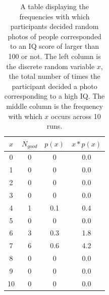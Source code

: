 \documentclass{article}
\begin{document}
\begin{enumerate}
\begin{table}
\centering
\begin{tabular}{| c | c | c | c |}
\hline
\textbf{$x$} & $N_{good}$ & $p(x)$ & $x*p(x)$ \\ \hline \hline
0 & 0 & 0 & 0.0 \\ \hline
1 & 0 & 0 & 0.0 \\ \hline
2 & 0 & 0 & 0.0 \\ \hline
3 & 0 & 0 & 0.0 \\ \hline
4 & 1 & 0.1 & 0.4 \\ \hline
5 & 0 & 0 & 0.0 \\ \hline
6 & 3 & 0.3 & 1.8 \\ \hline
7 & 6 & 0.6 & 4.2 \\ \hline
8 & 0 & 0 & 0.0 \\ \hline
9 & 0 & 0 & 0.0 \\ \hline
10 & 0 & 0 & 0.0 \\ \hline
\hline
\end{tabular}
\caption{\label{tab:baby} A table displaying the frequencies with which participants decided random photos of people corresponded to an IQ score of larger than 100 or not.  The left column is the discrete random variable $x$, the total number of times the participant decided a photo corresponding to a high IQ.  The middle column is the frequency with which $x$ occurs across 10 runs.}
\end{table}
\end{enumerate}
\end{document}
